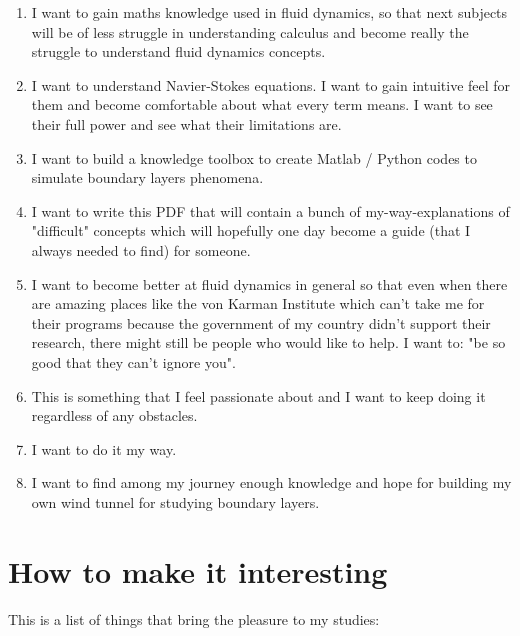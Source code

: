 \documentclass[12pt]{report}
\begin{document}
\begin{enumerate}

\item I want to gain maths knowledge used in fluid dynamics, so that next subjects will be of less struggle in understanding calculus and become really the struggle to understand fluid dynamics concepts.

\item I want to understand Navier-Stokes equations. I want to gain intuitive feel for them and become comfortable about what every term means. I want to see their full power and see what their limitations are.

\item I want to build a knowledge toolbox to create Matlab / Python codes to simulate boundary layers phenomena.

\item I want to write this PDF that will contain a bunch of my-way-explanations of "difficult" concepts which will hopefully one day become a guide (that I always needed to find) for someone.

\item I want to become better at fluid dynamics in general so that even when there are amazing places like the von Karman Institute which can't take me for their programs because the government of my country didn't support their research, there might still be people who would like to help. I want to: "be so good that they can't ignore you".

\item This is something that I feel passionate about and I want to keep doing it regardless of any obstacles.

\item I want to do it my way.

\item I want to find among my journey enough knowledge and hope for building my own wind tunnel for studying boundary layers.

\end{enumerate}



\section{How to make it interesting} \label{chap:interesting}

This is a list of things that bring the pleasure to my studies:
\end{document}
